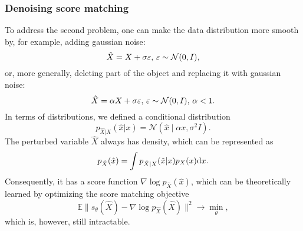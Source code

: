 \subsubsection{Denoising score matching}
To address the second problem, one can make the data distribution more smooth by, for example, adding gaussian noise:
\[
    \hat{X} = X + \sigma \varepsilon,
    \, \varepsilon \sim \mathcal{N}(0, I),
\]
or, more generally, deleting part of the object and replacing it with gaussian noise:
\[
    \hat{X} = \alpha X + \sigma \varepsilon, \, \varepsilon \sim \mathcal{N}(0, I), \, \alpha < 1.
\]
In terms of distributions, we defined a conditional distribution
\[
    p_{\hat{X} | X}(\hat{x} | x) = \mathcal{N}(\hat{x} \mid \alpha x, \sigma^2 I).
\]
The perturbed variable $\hat{X}$ always has density, which can be represented as
\begin{equation}\label{eq:total_density}
    p_{\hat{X}}(\hat{x}) = \int p_{\hat{X} | X}(\hat{x} | x)p_{X}(x) \mathrm{d} x.    
\end{equation}
Consequently, it has a score function $\nabla \log p_{\hat{X}}(\hat{x})$, which can be theoretically learned by optimizing the score matching objective
\[
    \mathbb{E}\| s_\theta(\hat{X}) - \nabla \log p_{\hat{X}}(\hat{X}) \|^2 \rightarrow \min\limits_{\theta},
\]
which is, however, still intractable.

